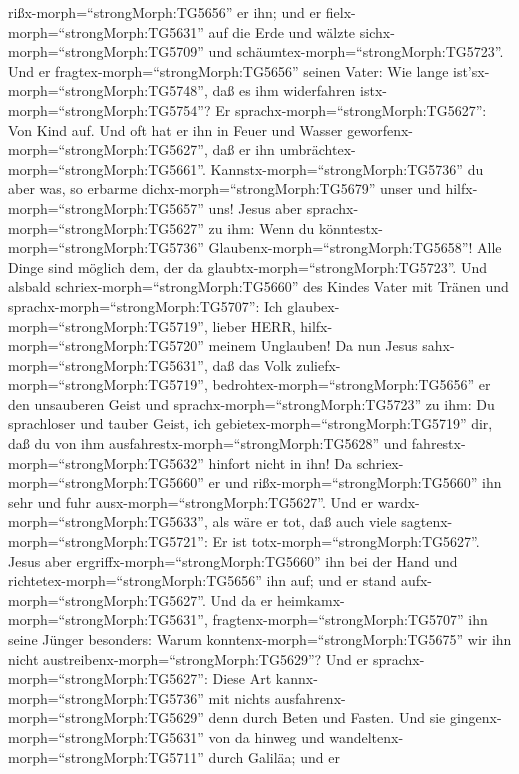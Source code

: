 rißx-morph=``strongMorph:TG5656'' er ihn; und er
fielx-morph=``strongMorph:TG5631'' auf die Erde und wälzte
sichx-morph=``strongMorph:TG5709'' und
schäumtex-morph=``strongMorph:TG5723''.  Und er
fragtex-morph=``strongMorph:TG5656'' seinen Vater: Wie lange
ist'sx-morph=``strongMorph:TG5748'', daß es ihm widerfahren
istx-morph=``strongMorph:TG5754''? Er
sprachx-morph=``strongMorph:TG5627'': Von Kind auf.  Und
oft hat er ihn in Feuer und Wasser
geworfenx-morph=``strongMorph:TG5627'', daß er ihn
umbrächtex-morph=``strongMorph:TG5661''.
Kannstx-morph=``strongMorph:TG5736'' du aber was, so erbarme
dichx-morph=``strongMorph:TG5679'' unser und
hilfx-morph=``strongMorph:TG5657'' uns!  Jesus aber
sprachx-morph=``strongMorph:TG5627'' zu ihm: Wenn du
könntestx-morph=``strongMorph:TG5736''
Glaubenx-morph=``strongMorph:TG5658''! Alle Dinge sind möglich dem, der
da glaubtx-morph=``strongMorph:TG5723''.  Und alsbald
schriex-morph=``strongMorph:TG5660'' des Kindes Vater mit Tränen und
sprachx-morph=``strongMorph:TG5707'': Ich
glaubex-morph=``strongMorph:TG5719'', lieber HERR,
hilfx-morph=``strongMorph:TG5720'' meinem Unglauben!  Da
nun Jesus sahx-morph=``strongMorph:TG5631'', daß das Volk
zuliefx-morph=``strongMorph:TG5719'',
bedrohtex-morph=``strongMorph:TG5656'' er den unsauberen Geist und
sprachx-morph=``strongMorph:TG5723'' zu ihm: Du sprachloser und tauber
Geist, ich gebietex-morph=``strongMorph:TG5719'' dir, daß du von ihm
ausfahrestx-morph=``strongMorph:TG5628'' und
fahrestx-morph=``strongMorph:TG5632'' hinfort nicht in ihn!
 Da schriex-morph=``strongMorph:TG5660'' er und
rißx-morph=``strongMorph:TG5660'' ihn sehr und fuhr
ausx-morph=``strongMorph:TG5627''. Und er
wardx-morph=``strongMorph:TG5633'', als wäre er tot, daß auch viele
sagtenx-morph=``strongMorph:TG5721'': Er ist
totx-morph=``strongMorph:TG5627''.  Jesus aber
ergriffx-morph=``strongMorph:TG5660'' ihn bei der Hand und
richtetex-morph=``strongMorph:TG5656'' ihn auf; und er stand
aufx-morph=``strongMorph:TG5627''.  Und da er
heimkamx-morph=``strongMorph:TG5631'',
fragtenx-morph=``strongMorph:TG5707'' ihn seine Jünger besonders: Warum
konntenx-morph=``strongMorph:TG5675'' wir ihn nicht
austreibenx-morph=``strongMorph:TG5629''?  Und er
sprachx-morph=``strongMorph:TG5627'': Diese Art
kannx-morph=``strongMorph:TG5736'' mit nichts
ausfahrenx-morph=``strongMorph:TG5629'' denn durch Beten und Fasten.
 Und sie gingenx-morph=``strongMorph:TG5631'' von da hinweg
und wandeltenx-morph=``strongMorph:TG5711'' durch Galiläa; und er
